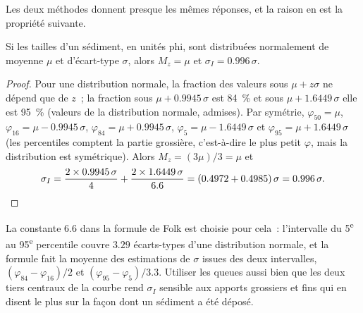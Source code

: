 Les deux méthodes donnent presque les mêmes réponses, et la raison en est la propriété
suivante.

\begin{proposition}\label{prop:b1:clastic-sediments:normal}
Si les tailles d'un sédiment, en unités phi, sont distribuées normalement de moyenne
$\mu$ et d'écart-type $\sigma$, alors $M_z = \mu$ et $\sigma_I = 0.996\,\sigma$.
\end{proposition}

\begin{proof}
Pour une distribution normale, la fraction des valeurs sous $\mu + z\sigma$ ne dépend
que de $z$~; la fraction sous $\mu + 0.9945\,\sigma$ est \qty{84}{\percent}
et sous $\mu + 1.6449\,\sigma$ elle est \qty{95}{\percent} (valeurs de la distribution
normale, admises). Par symétrie, $\varphi_{50} = \mu$, $\varphi_{16} = \mu -
0.9945\,\sigma$, $\varphi_{84} = \mu + 0.9945\,\sigma$, $\varphi_5 = \mu -
1.6449\,\sigma$ et $\varphi_{95} = \mu + 1.6449\,\sigma$ (les percentiles comptent
la partie grossière, c'est-à-dire le plus petit $\varphi$, mais la distribution est
symétrique). Alors $M_z = (3\mu)/3 = \mu$ et
\[
  \sigma_I = \frac{2 \times 0.9945\,\sigma}{4} + \frac{2 \times 1.6449\,\sigma}{6.6}
  = (0.4972 + 0.4985)\,\sigma = 0.996\,\sigma. \qedhere
\]
\end{proof}

La constante 6.6 dans la formule de Folk est choisie pour cela~: l'intervalle du
5\textsuperscript{e} au 95\textsuperscript{e} percentile couvre $3.29$ écarts-types d'une distribution
normale, et la formule fait la moyenne des estimations de $\sigma$ issues des deux
intervalles, $(\varphi_{84}-\varphi_{16})/2$ et $(\varphi_{95}-\varphi_5)/3.3$.
Utiliser les queues aussi bien que les deux tiers centraux de la courbe rend $\sigma_I$
sensible aux apports grossiers et fins qui en disent le plus sur la façon dont un
sédiment a été déposé.

